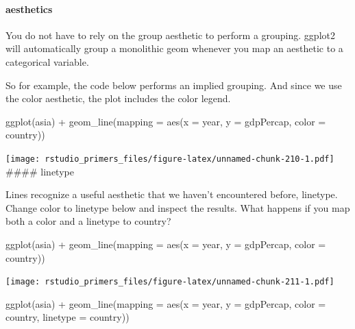 \documentclass[
]{article}
\newenvironment{Shaded}{\begin{snugshade}}{\end{snugshade}}
\newcommand{\AttributeTok}[1]{\textcolor[rgb]{0.77,0.63,0.00}{#1}}
\newcommand{\FunctionTok}[1]{\textcolor[rgb]{0.00,0.00,0.00}{#1}}
\newcommand{\NormalTok}[1]{#1}
\newcommand{\SpecialCharTok}[1]{\textcolor[rgb]{0.00,0.00,0.00}{#1}}
\begin{document}
\hypertarget{aesthetics-4}{%
\paragraph{aesthetics}\label{aesthetics-4}}

You do not have to rely on the group aesthetic to perform a grouping.
ggplot2 will automatically group a monolithic geom whenever you map an
aesthetic to a categorical variable.

So for example, the code below performs an implied grouping. And since
we use the color aesthetic, the plot includes the color legend.

\begin{Shaded}
\begin{Highlighting}[]
\FunctionTok{ggplot}\NormalTok{(asia) }\SpecialCharTok{+}
  \FunctionTok{geom\_line}\NormalTok{(}\AttributeTok{mapping =} \FunctionTok{aes}\NormalTok{(}\AttributeTok{x =}\NormalTok{ year, }\AttributeTok{y =}\NormalTok{ gdpPercap, }\AttributeTok{color =}\NormalTok{ country))}
\end{Highlighting}
\end{Shaded}

\texttt{[image: rstudio\_primers\_files/figure-latex/unnamed-chunk-210-1.pdf]}
\#\#\#\# linetype

Lines recognize a useful aesthetic that we haven't encountered before,
linetype. Change color to linetype below and inspect the results. What
happens if you map both a color and a linetype to country?

\begin{Shaded}
\begin{Highlighting}[]
\FunctionTok{ggplot}\NormalTok{(asia) }\SpecialCharTok{+}
  \FunctionTok{geom\_line}\NormalTok{(}\AttributeTok{mapping =} \FunctionTok{aes}\NormalTok{(}\AttributeTok{x =}\NormalTok{ year, }\AttributeTok{y =}\NormalTok{ gdpPercap, }\AttributeTok{color =}\NormalTok{ country))}
\end{Highlighting}
\end{Shaded}

\texttt{[image: rstudio\_primers\_files/figure-latex/unnamed-chunk-211-1.pdf]}

\begin{Shaded}
\begin{Highlighting}[]
\FunctionTok{ggplot}\NormalTok{(asia) }\SpecialCharTok{+}
  \FunctionTok{geom\_line}\NormalTok{(}\AttributeTok{mapping =} \FunctionTok{aes}\NormalTok{(}\AttributeTok{x =}\NormalTok{ year, }\AttributeTok{y =}\NormalTok{ gdpPercap, }\AttributeTok{color =}\NormalTok{ country, }\AttributeTok{linetype =}\NormalTok{ country))}
\end{Highlighting}
\end{Shaded}
\end{document}
